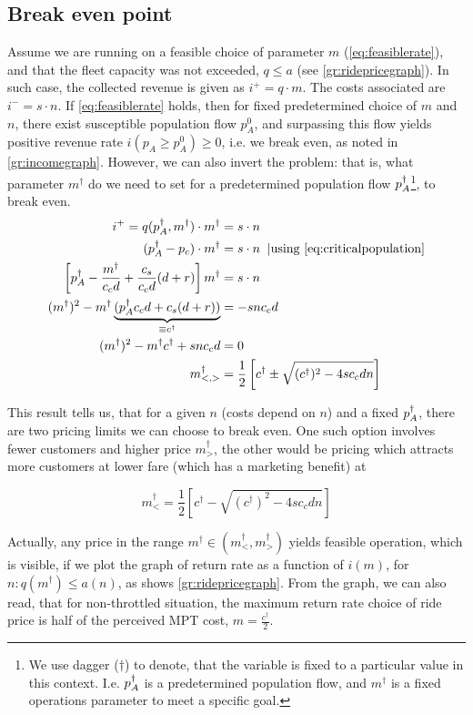 \documentclass[a4paper]{report}
\begin{document}
\def\md{m^{\dagger}}
\def\cd{c^{\dagger}}
\subsection{Break even point}
\label{ss:breakeven}
Assume we are running on a feasible choice of parameter $m$ (\autoref{eq:feasiblerate}), and that the fleet capacity was not exceeded, $q\leq a$ (see \autoref{gr:ridepricegraph}). In such case, the collected revenue is given as $i^{+}=q\cdot m$. The costs associated are $i^-=s\cdot n$. If \autoref{eq:feasiblerate} holds, then for fixed predetermined choice of $m$ and $n$, there exist susceptible population flow $p_A^0$, and surpassing this flow yields positive revenue rate $i(p_A\geq p_A^0)\geq 0$, i.e. we break even, as noted in \autoref{gr:incomegraph}. However, we can also invert the problem: that is, what parameter $\md$ do we need to set for a predetermined population flow $p_A^{\dagger}$\footnote{We use dagger ($\dagger$) to denote, that the variable is fixed to a particular value in this context. I.e. $p_A^{\dagger}$ is a predetermined population flow, and $\md$ is a fixed operations parameter to meet a specific goal.}, to break even.
\begin{align*}
	i^{+}=q(\pd,\md)\cdot \md&=s \cdot n\\
		(\pd - p_c)\cdot \md&=s\cdot n\;\;| \text{using \autoref{eq:criticalpopulation}}\\
		\left[\pd -\frac{\md}{c_c d}+\frac{c_s}{c_c d} (d+r)\right]\md&=s\cdot n\\
		(\md)^2-\md\underbrace{(\pd c_cd +c_s(d+r))}_{\equiv \cd} 		&=-snc_cd\\
		(\md)^2-\md \cd + snc_cd &=0\\
		\md_{\text{<,>}}&=\frac{1}{2}\left[\cd\pm\sqrt{(\cd)^2-4sc_cdn}\right]
\end{align*}

This result tells us, that for a given $n$ (costs depend on $n$) and a fixed $p_A^{\dagger}$, there are two pricing limits we can choose to break even. One such option involves fewer customers and higher price $\md_>$, the other would be pricing which attracts more customers at lower fare (which has a marketing benefit) at

\begin{equation}
	\md_{\text{<}}=\frac{1}{2}\left[\cd-\sqrt{(\cd)^2-4sc_cdn}\right]	\label{eq:breakeven}
\end{equation}

Actually, any price in the range $\md \in (\md_<,\md_>)$ yields feasible operation, which is visible, if we plot the graph of return rate as a function of $i(m)$, for $n: q(\md)\leq a(n)$, as shows \autoref{gr:ridepricegraph}. From the graph, we can also read, that for non-throttled situation, the maximum return rate choice of ride price is half of the perceived MPT cost, $m=\frac{\cd}{2}$.%
\end{document}
